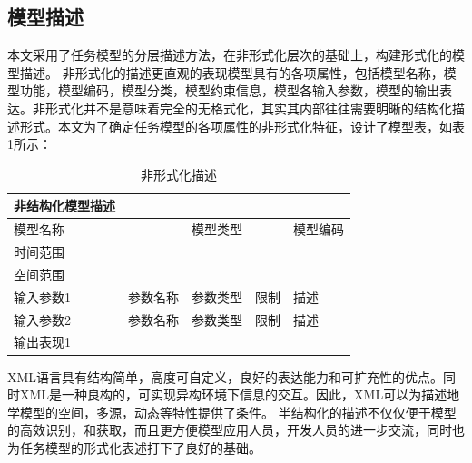 \documentclass[master]{njnuthesis}
\begin{document}
\subsection{模型描述}
本文采用了任务模型的分层描述方法，在非形式化层次的基础上，构建形式化的模型描述。
非形式化的描述更直观的表现模型具有的各项属性，包括模型名称，模型功能，模型编码，模型分类，模型约束信息，模型各输入参数，模型的输出表达。非形式化并不是意味着完全的无格式化，其实其内部往往需要明晰的结构化描述形式。本文为了确定任务模型的各项属性的非形式化特征，设计了模型表，如表1所示：

\begin{table}[ht]
\caption{非形式化描述} \label{table4}
\begin{center}
\begin{tabular}{lllll}
\hline
 非结构化模型描述  &            &            &        &            \\
\hline
 模型名称          &            &  模型类型  &        &  模型编码  \\
 时间范围          &            &            &        &            \\
 空间范围          &            &            &        &            \\
\hline
 输入参数1         &  参数名称  &  参数类型  &  限制  &  描述      \\
 输入参数2         &  参数名称  &  参数类型  &  限制  &  描述      \\
\hline
 输出表现1         &            &            &        &            \\
\hline
\end{tabular}
\end{center}
\end{table}

XML语言具有结构简单，高度可自定义，良好的表达能力和可扩充性的优点。同时XML是一种良构的，可实现异构环境下信息的交互。因此，XML可以为描述地学模型的空间，多源，动态等特性提供了条件。
半结构化的描述不仅仅便于模型的高效识别，和获取，而且更方便模型应用人员，开发人员的进一步交流，同时也为任务模型的形式化表述打下了良好的基础。
\end{document}
